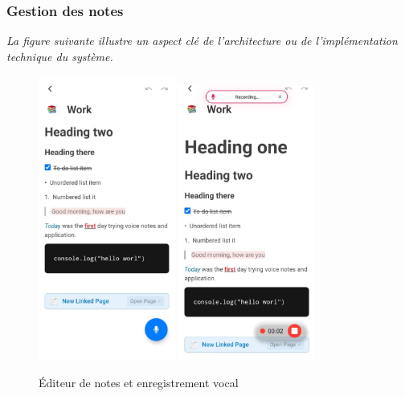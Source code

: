 \subsubsection{Gestion des notes}
\noindent
\textit{La figure suivante illustre un aspect clé de l'architecture ou de l'implémentation technique du système.}
\begin{figure}[H]
    \centering
    \includegraphics[width=0.4\textwidth]{assets/docs/mobile/note-page.png}
    \hfill
    \includegraphics[width=0.4\textwidth]{assets/docs/mobile/note-page-recording.png}
    \caption{Éditeur de notes et enregistrement vocal}
    \label{fig:mobile-editor}
\end{figure}

